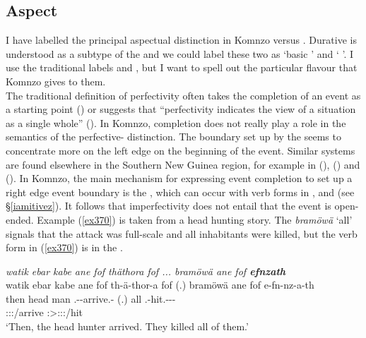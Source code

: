 \subsection{Aspect}\label{TAMsemaspect}

I have labelled the principal aspectual distinction in Komnzo  versus . Durative  is understood as a subtype of the  and we could label these two as `basic ' and ` '. I use the traditional labels  and , but I want to spell out the particular flavour that Komnzo gives to them.\\

The traditional definition of perfectivity often takes the completion of an event as a starting point (\citealt[296]{Frawley:1992wi}) or suggests that ``perfectivity indicates the view of a situation as a single whole'' (\citealt[16]{Comrie:1976vd}). In Komnzo, completion does not really play a role in the semantics of the perfective- distinction. The boundary set up by the  seems to concentrate more on the left edge \textendash{} on the beginning of the event. Similar systems are found elsewhere in the Southern New Guinea region, for example in  (\citealt[41]{Drabbe:1955tm}),  (\citealt{Siegel:2015bp}) and  (\citealt{Evans:2015wy}). In Komnzo, the main mechanism for expressing event completion \textendash{} to set up a right edge event boundary \textendash{} is the  , which can occur with verb forms in ,  and   (see \S{}\ref{iamitivez}). It follows that imperfectivity does not entail that the event is open-ended. Example (\ref{ex370}) is taken from a head hunting story. The  \emph{bramöwä} `all' signals that the attack was full-scale and all inhabitants were killed, but the verb form in (\ref{ex370}) is in the .

\begin{exe}
	\ex \emph{watik ebar kabe ane fof thäthora fof ... bramöwä ane fof \textbf{efnzath}}\\
	\glll watik ebar kabe ane fof th-ä-thor-a fof (.) bramöwä ane fof e-fn-nz-a-th\\
	then head man \Dem{} \Emph{} \Stnsg.\Gam-\Ndu-arrive.\Rs-\Pst{} \Emph{} (.) all \Dem{} \Emph{} \Stnsg.\Alph-hit.\Ext-\Ndu-\Pst-\Stnsg{}\\
	{} {} {} {} {} \footnotesize{\Stpl:\Sbj:\Pst:\Pfv/arrive} {} {} {} {} {} \footnotesize{\Stpl:\Sbj>\Stpl:\Obj:\Pst:\Ipfv/hit}\\
	\trans `Then, the head hunter arrived. They killed all of them.'\\
	\label{ex370}
\end{exe}

